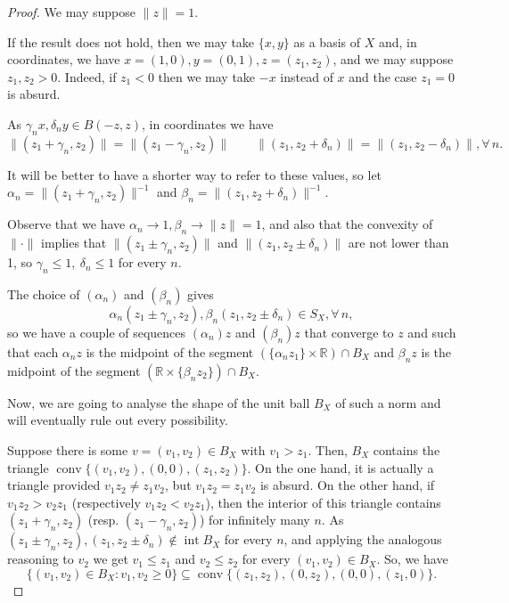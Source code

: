 \documentclass[12pt]{amsproc}
\theoremstyle{remark}
\def\equi{=}
\def\interior{\operatorname{int}}
\def\conv{\operatorname{conv}}
\def\R{\mathbb R}
\def\norma{\|\cdot\|}
\begin{document}
\begin{proof}
We may suppose $\|z\|=1$. 

If the result does not hold, then we may take $\{x,y\}$ as a basis of $X$ and, 
in coordinates, we have $x\equi(1,0), y\equi(0,1), z\equi(z_1,z_2)$, and we may suppose $z_1, z_2>0$. 
Indeed, if $z_1<0$ then we may take $-x$ instead of $x$ and the case $z_1=0$ is absurd. 

As $\gamma_nx, \delta_ny\in B(-z,z)$, in coordinates we have 
$$\|(z_1+\gamma_n,z_2)\|=\|(z_1-\gamma_n,z_2)\|\qquad \|(z_1,z_2+\delta_n)\|=\|(z_1,z_2-\delta_n)\|, \forall\,n.$$

It will be better to have a shorter way to refer to these values, so let $\alpha_n=\|(z_1+\gamma_n,z_2)\|^{-1}$ 
and $\beta_n=\|(z_1,z_2+\delta_n)\|^{-1}$. 

Observe that we have $\alpha_n\to 1, \beta_n\to\|z\|= 1$, and also that the convexity 
of $\norma$ implies that $\|( z_1\pm\gamma_n,z_2)\|$ and $\|( z_1,z_2\pm\delta_n)\|$ 
are not lower than 1, so $\gamma_n\leq 1,\ \delta_n\leq 1$ for every $n$.

The choice of $(\alpha_n)$ and $(\beta_n)$ gives 
$$\alpha_n( z_1\pm\gamma_n,z_2), \beta_n( z_1,z_2\pm\delta_n)\in S_X, \forall\,n,$$
so we have a couple of sequences $(\alpha_n)z$ and $(\beta_n)z$ that converge to $z$ and such that
each $\alpha_nz$ is the midpoint of the segment $(\{\alpha_n z_1\}\times\R)\cap B_X$ and $\beta_nz$ 
is the midpoint of the segment $(\R\times\{\beta_nz_2\})\cap B_X$. 

Now, we are going to analyse the shape of the unit ball $B_X$ of such a norm and will 
eventually rule out every possibility. %

Suppose there is some $v\equi(v_1,v_2)\in B_X$ with $v_1>z_1$. Then, $B_X$ contains the 
triangle $\conv\{(v_1,v_2), (0,0),(z_1,z_2)\}$. On the one hand, it is actually a triangle 
provided $v_1z_2\neq z_1v_2$, but $v_1z_2= z_1v_2$ is absurd. 
On the other hand, if $v_1z_2>v_2z_1$ (respectively $v_1z_2<v_2z_1$), then the interior of 
this triangle contains $(z_1+\gamma_n,z_2)$ (resp. $(z_1-\gamma_n,z_2)$) for infinitely many $n$. 
As $( z_1\pm\gamma_n,z_2), ( z_1,z_2\pm\delta_n)\not\in\interior B_X$ for every $n$, 
and applying the analogous reasoning to $v_2$ we get $v_1\leq z_1$ and $v_2\leq z_2$ 
for every $(v_1,v_2)\in B_X$. So, we have
$$\{(v_1,v_2)\in B_X:v_1, v_2\geq 0\}\subseteq\conv\{(z_1,z_2),(0,z_2),(0,0),(z_1,0)\}.$$


\end{proof}
\end{document}
